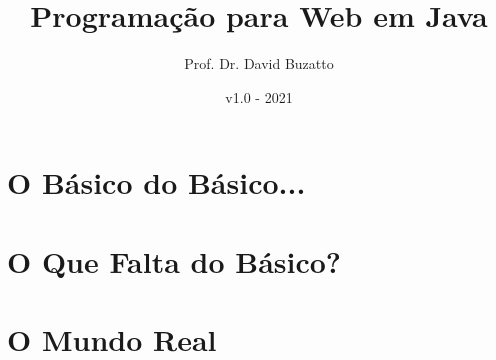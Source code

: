\documentclass[
    12pt,     
    openright,
    twoside,  
    a4paper,  
    english,  
    brazil,   
]{memoir}
\title{Programação para Web em Java}
\author{Prof. Dr. David Buzatto}
\date{v1.0 - 2021}
\begin{document}
\frenchspacing 

\frontmatter




\renewcommand\chaptitlefont{\normalfont\huge\bfseries\scshape\color{corAzulTema}}
    
\listoffigures*
\cleardoublepage

\listoftables*
\cleardoublepage

\tableofcontents*
\cleardoublepage


\mainmatter




\part{O Básico do Básico...}







\part{O Que Falta do Básico?}




\part{O Mundo Real}






\backmatter


\end{document}
